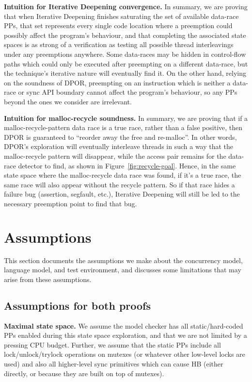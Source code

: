 \documentclass[pldi]{sigplanconf-pldi15}
\begin{document}
{\bf Intuition for Iterative Deepening convergence.}
In summary, we are proving that when Iterative Deepening finishes saturating the set of available data-race PPs,
that set represents every single code location where a preemption could possibly affect the program's behaviour,
and that completing the associated state spaces is as strong of a verification as testing all possible thread interleavings under any preemptions anywhere.
Some data-races may be hidden in control-flow paths which could only be executed after preempting on a different data-race,
but the technique's iterative nature will eventually find it.
On the other hand, relying on the soundness of DPOR, preempting on an instruction which is neither a data-race or sync API boundary cannot affect the program's behaviour,
so any PPs beyond the ones we consider are irrelevant.

{\bf Intuition for malloc-recycle soundness.}
In summary, we are proving that if a malloc-recycle-pattern data race is a true race, rather than a false positive,
then DPOR is guaranteed to ``reorder away the free and re-malloc''.
In other words, DPOR's exploration will eventually interleave threads in such a way that the malloc-recycle pattern will disappear,
while the access pair remains for the data-race detector to find, as shown in Figure~\ref{fig:recycle-goal}.
Hence, in the same state space where the malloc-recycle data race was found, if it's a true race, the same race will also appear without the recycle pattern.
So if that race hides a failure bug (assertion, segfault, etc.), Iterative Deepening will still be led to the necessary preemption point to find that bug.


\section{Assumptions}

This section documents the assumptions we make about the concurrency model, language model, and test environment,
and discusses some limitations that may arise from these assumptions.

\subsection{Assumptions for both proofs}

{\bf Maximal state space.}
We assume the model checker has all static/hard-coded PPs enabled during this state space exploration,
and that we are not limited by a pressing CPU budget.
Further, we assume that the static PPs include all lock/unlock/trylock operations on mutexes (or whatever other low-level locks are used) and also all higher-level sync primitives which can cause HB (either directly, or because they are built on top of mutexes).
\end{document}
